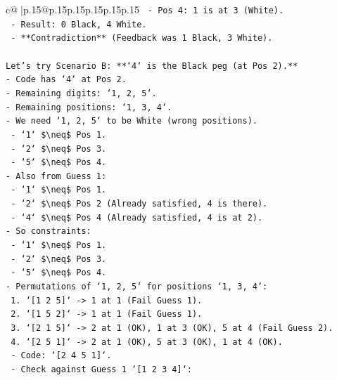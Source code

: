 \documentclass{article}
\begin{document}
{\begin{supertabular}{c@{$\;$}|p{.15\linewidth}@{}p{.15\linewidth}p{.15\linewidth}p{.15\linewidth}p{.15\linewidth}p{.15\linewidth}}
{{{\texttt{    {-} Pos 4: 1 is at 3 (White).} \\
\texttt{    {-} Result: 0 Black, 4 White.} \\
\texttt{    {-} **Contradiction** (Feedback was 1 Black, 3 White).} \\
\\ 
\texttt{Let's try Scenario B: **`4` is the Black peg (at Pos 2).**} \\
\texttt{{-} Code has `4` at Pos 2.} \\
\texttt{{-} Remaining digits: `1, 2, 5`.} \\
\texttt{{-} Remaining positions: `1, 3, 4`.} \\
\texttt{{-} We need `1, 2, 5` to be White (wrong positions).} \\
\texttt{    {-} `1` \$\textbackslash{}neq\$ Pos 1.} \\
\texttt{    {-} `2` \$\textbackslash{}neq\$ Pos 3.} \\
\texttt{    {-} `5` \$\textbackslash{}neq\$ Pos 4.} \\
\texttt{{-} Also from Guess 1:} \\
\texttt{    {-} `1` \$\textbackslash{}neq\$ Pos 1.} \\
\texttt{    {-} `2` \$\textbackslash{}neq\$ Pos 2 (Already satisfied, 4 is there).} \\
\texttt{    {-} `4` \$\textbackslash{}neq\$ Pos 4 (Already satisfied, 4 is at 2).} \\
\texttt{{-} So constraints:} \\
\texttt{    {-} `1` \$\textbackslash{}neq\$ Pos 1.} \\
\texttt{    {-} `2` \$\textbackslash{}neq\$ Pos 3.} \\
\texttt{    {-} `5` \$\textbackslash{}neq\$ Pos 4.} \\
\texttt{{-} Permutations of `1, 2, 5` for positions `1, 3, 4`:} \\
\texttt{    1. `{[}1 2 5{]}` {-}> 1 at 1 (Fail Guess 1).} \\
\texttt{    2. `{[}1 5 2{]}` {-}> 1 at 1 (Fail Guess 1).} \\
\texttt{    3. `{[}2 1 5{]}` {-}> 2 at 1 (OK), 1 at 3 (OK), 5 at 4 (Fail Guess 2).} \\
\texttt{    4. `{[}2 5 1{]}` {-}> 2 at 1 (OK), 5 at 3 (OK), 1 at 4 (OK).} \\
\texttt{       {-} Code: `{[}2 4 5 1{]}`.} \\
\texttt{       {-} Check against Guess 1 `{[}1 2 3 4{]}`:} \\
}}}
\end{supertabular}}
\end{document}
